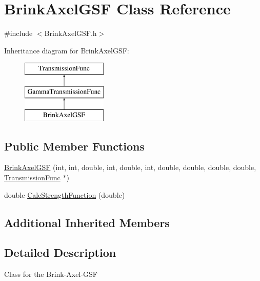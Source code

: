 \hypertarget{classBrinkAxelGSF}{\section{Brink\-Axel\-G\-S\-F Class Reference}
\label{classBrinkAxelGSF}
}


{\ttfamily \#include $<$Brink\-Axel\-G\-S\-F.\-h$>$}

Inheritance diagram for Brink\-Axel\-G\-S\-F\-:\begin{figure}[H]
\begin{center}
\leavevmode
\includegraphics[height=3.000000cm]{d1/d51/classBrinkAxelGSF}
\end{center}
\end{figure}
\subsection*{Public Member Functions}
\begin{DoxyCompactItemize}
\item 
\hyperlink{classBrinkAxelGSF_aa90ed101a34e1d3013eff1434bdaab31}{Brink\-Axel\-G\-S\-F} (int, int, double, int, double, int, double, double, double, double, \hyperlink{classTransmissionFunc}{Transmission\-Func} $\ast$)
\item 
double \hyperlink{classBrinkAxelGSF_ac914ac4c34b969ea5b430e07199ed397}{Calc\-Strength\-Function} (double)
\end{DoxyCompactItemize}
\subsection*{Additional Inherited Members}


\subsection{Detailed Description}
Class for the Brink-\/\-Axel-\/\-G\-S\-F 

